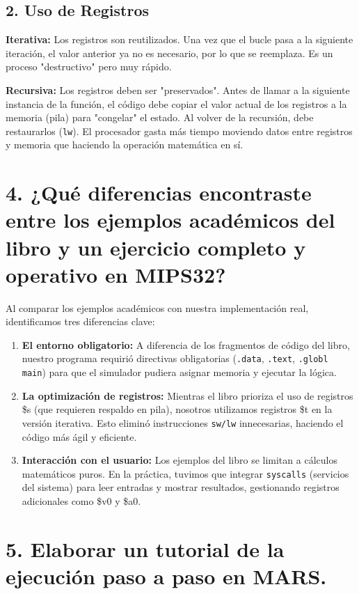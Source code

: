 \documentclass[12pt]{article}
\begin{document}
\subsection*{2. Uso de Registros}

\textbf{Iterativa:} Los registros son reutilizados. Una vez que el bucle pasa a la siguiente iteración, el valor anterior ya no es necesario, por lo que se reemplaza. Es un proceso "destructivo" pero muy rápido.

\textbf{Recursiva:} Los registros deben ser "preservados". Antes de llamar a la siguiente instancia de la función, el código debe copiar el valor actual de los registros a la memoria (pila) para "congelar" el estado. Al volver de la recursión, debe restaurarlos (\texttt{lw}). El procesador gasta más tiempo moviendo datos entre registros y memoria que haciendo la operación matemática en sí.

\section*{4. ¿Qué diferencias encontraste entre los ejemplos académicos del libro y un ejercicio completo y operativo en MIPS32?}

Al comparar los ejemplos académicos con nuestra implementación real, identificamos tres diferencias clave:

\begin{enumerate}
    \item \textbf{El entorno obligatorio:} A diferencia de los fragmentos de código del libro, nuestro programa requirió directivas obligatorias (\texttt{.data}, \texttt{.text}, \texttt{.globl main}) para que el simulador pudiera asignar memoria y ejecutar la lógica.
    \item \textbf{La optimización de registros:} Mientras el libro prioriza el uso de registros \$s (que requieren respaldo en pila), nosotros utilizamos registros \$t en la versión iterativa. Esto eliminó instrucciones \texttt{sw/lw} innecesarias, haciendo el código más ágil y eficiente.
    \item \textbf{Interacción con el usuario:} Los ejemplos del libro se limitan a cálculos matemáticos puros. En la práctica, tuvimos que integrar \texttt{syscalls} (servicios del sistema) para leer entradas y mostrar resultados, gestionando registros adicionales como \$v0 y \$a0.
\end{enumerate}

\section*{5. Elaborar un tutorial de la ejecución paso a paso en MARS.}
\end{document}
